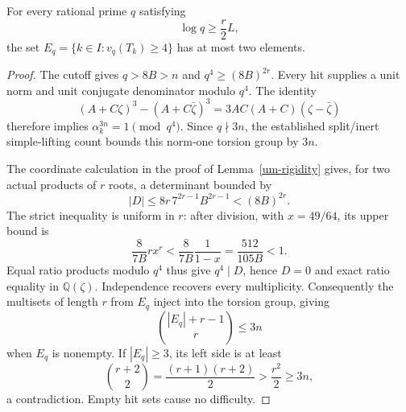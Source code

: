 \begin{theorem}\label{vlg-endpoints}
For every rational prime \(q\) satisfying
\begin{equation}\label{vlg-cutoff}
 \log q\geq \frac r2 L,
\end{equation}
the set \(E_q=\{k\in I:v_q(T_k)\geq4\}\) has at most two elements.
\end{theorem}
\begin{proof}
The cutoff gives \(q>8B>n\) and \(q^4\geq(8B)^{2r}\).
Every hit supplies a unit norm and unit conjugate denominator
modulo \(q^4\). The identity
\[
 (A+C\zeta)^3-(A+C\bar\zeta)^3
   =3AC(A+C)(\zeta-\bar\zeta)
\]
therefore implies \(\alpha_k^{3n}=1\pmod{q^4}\).
Since \(q\nmid3n\), the established split/inert simple-lifting count
bounds this norm-one torsion group by \(3n\).

The coordinate calculation in the proof of Lemma~\ref{um-rigidity}
gives, for two actual products of \(r\) roots, a determinant bounded by
\[
 |D|\leq8r\,7^{2r-1}B^{2r-1}<(8B)^{2r}.
\]
The strict inequality is uniform in \(r\): after division, with
\(x=49/64\), its upper bound is
\[
 \frac8{7B}r x^r
 <\frac8{7B}\frac1{1-x}
 =\frac{512}{105B}<1.
\]
Equal ratio products modulo \(q^4\) thus give \(q^4\mid D\), hence
\(D=0\) and exact ratio equality in \(\mathbb Q(\zeta)\).
Independence recovers every multiplicity. Consequently the multisets
of length \(r\) from \(E_q\) inject into the torsion group, giving
\[
 \binom{|E_q|+r-1}{r}\leq3n
\]
when \(E_q\) is nonempty. If \(|E_q|\geq3\), its left side is at least
\[
 \binom{r+2}{2}=\frac{(r+1)(r+2)}2>\frac{r^2}2\geq3n,
\]
a contradiction. Empty hit sets cause no difficulty.
\end{proof}

